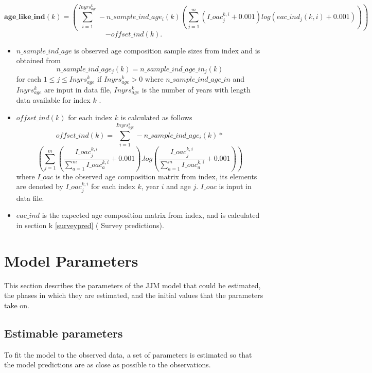 \documentclass{article}
\begin{document}
\begin{equation}
    \textbf{age\_like\_ind}(k)=\left(\sum_{i=1}^{Inyrs^k_{age}}-n\_sample\_ind\_age_i(k)\left(\sum_{j=1}^m(I\_oac^{k,i}_j%
    +0.001)log(eac\_ind_j(k,i)+0.001)\right)\right)
\end{equation}
\begin{equation*}
    -offset\_ind(k).
\end{equation*}
\begin{itemize}
    \item $n\_sample\_ind\_age$ is observed age composition sample sizes from index
 and is obtained from $$n\_sample\_ind\_age_j(k) = n\_sample\_ind\_age\_in_j(k)$$ for each $1\leq j \leq Inyrs^k_{age}$ if $Inyrs^k_{age}>0$ 
 where $n\_sample\_ind\_age\_in$ and $Inyrs^k_{age}$ are input  %
 in data file, $Inyrs^k_{age}$ is the number of years with length data available for
index $k$ %
 .
\item $offset\_ind(k)$ for each index $k$ is calculated as follows
\begin{equation*}
    offset\_ind(k)=\displaystyle\sum_{i=1}^{Inyrs^k_{age}}-n\_sample\_ind\_age_i(k)*
\end{equation*}
\begin{equation*}
   \left(\sum_{j=1}^m\left(\dfrac{I\_oac^{k,i}_j}{\sum_{a=1}^m I\_oac^{k,i}_a}+0.001\right).log\left(\dfrac{I\_oac^{k,i}_j}{\sum_{a=1}^m I\_oac^{k,i}_a}+0.001\right)\right)
\end{equation*}
where $I\_oac$ is the observed age composition matrix from index, %
its elements are denoted by $I\_oac^{k,i}_j$ for each index $k$, year $i$ and age $j$. %
$I\_oac$ is  input in data file.
\item $eac\_ind$ is the expected age composition matrix from index, and is calculated in section k \ref{surveypred} (
Survey predictions).
\end{itemize}

\section{Model Parameters}
This section describes the parameters of the JJM model that could be estimated, the phases in which they are estimated, and the initial values that the parameters take on.

\subsection{Estimable parameters}
To fit the model to the observed data, a set of parameters is estimated so that the model predictions are as close as possible to the observations.
\end{document}
